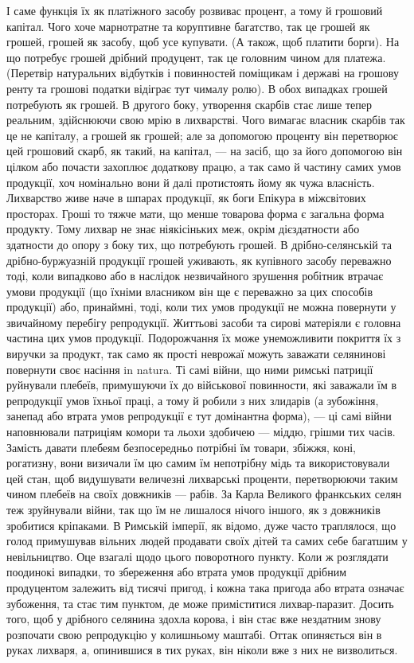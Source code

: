 \parcont{}  %
І саме функція їх як платіжного засобу розвивас процент, а тому й грошовий
капітал. Чого хоче марнотратне та коруптивне багатство, так це грошей
як грошей, грошей як засобу, щоб усе купувати. (А також, щоб платити борги).
На що потребує грошей дрібний продуцент, так це головним чином для платежа.
(Перетвір натуральних відбутків і повинностей поміщикам і державі на грошову
ренту та грошові податки відіграє тут чималу ролю). В обох випадках грошей
потребують як грошей. В другого боку, утворення скарбів стає лише тепер реальним,
здійснюючи свою мрію в лихварстві. Чого вимагає власник скарбів так це не капіталу,
а грошей як грошей; але за допомогою проценту він перетворює цей грошовий
скарб, як такий, на капітал, — на засіб, що за його допомогою він цілком або
почасти захоплює додаткову працю, а так само й частину самих умов продукції,
хоч номінально вони й далі протистоять йому як чужа власність.
Лихварство живе наче в шпарах продукції, як боги Епікура в міжсвітових просторах.
Гроші то тяжче мати, що менше товарова форма є загальна форма
продукту. Тому лихвар не знає ніякісіньких меж, окрім дієздатности або здатности
до опору з боку тих, що потребують грошей. В дрібно-селянській та
дрібно-буржуазній продукції грошей уживають, як купівного засобу переважно
тоді, коли випадково або в наслідок незвичайного зрушення робітник втрачає
умови продукції (що їхніми власником він ще є переважно за цих способів продукції)
або, принаймні, тоді, коли тих умов продукції не можна повернути у звичайному перебігу
репродукції. Життьові засоби та сирові матеріяли є головна частина цих умов
продукції. Подорожчання їх може унеможливити покриття їх з виручки за продукт,
так само як прості неврожаї можуть заважати селянинові повернути своє насіння in
natura. Ті самі війни, що ними римські патриції руйнували плебеїв, примушуючи
їх до військової повинности, які заважали їм в репродукції умов їхньої праці,
а тому й робили з них злидарів (а зубожіння, занепад або втрата умов
репродукції є тут домінантна форма), — ці самі війни наповнювали патриціям
комори та льохи здобичею — міддю, грішми тих часів. Замість давати плебеям
безпосередньо потрібні їм товари, збіжжя, коні, рогатизну, вони визичали
їм цю самим їм непотрібну мідь та використовували цей стан, щоб видушувати
величезні лихварські проценти, перетворюючи таким чином плебеїв на своїх
довжників — рабів. За Карла Великого франкських селян теж зруйнували війни,
так що їм не лишалося нічого іншого, як з довжників зробитися кріпаками.
В Римській імперії, як відомо, дуже часто траплялося, що голод примушував
вільних людей продавати своїх дітей та самих себе багатшим у невільництво. Оце
взагалі щодо цього поворотного пункту. Коли ж розглядати поодинокі випадки,
то збереження або втрата умов продукції дрібним продуцентом залежить від
тисячі пригод, і кожна така пригода або втрата означає зубоження, та стає
тим пунктом, де може приміститися лихвар-паразит. Досить того, щоб у дрібного
селянина здохла корова, і він стає вже нездатним знову розпочати свою репродукцію
у колишньому маштабі. Оттак опиняється він в руках лихваря, а, опинившися
в тих руках, він ніколи вже з них не визволиться.


